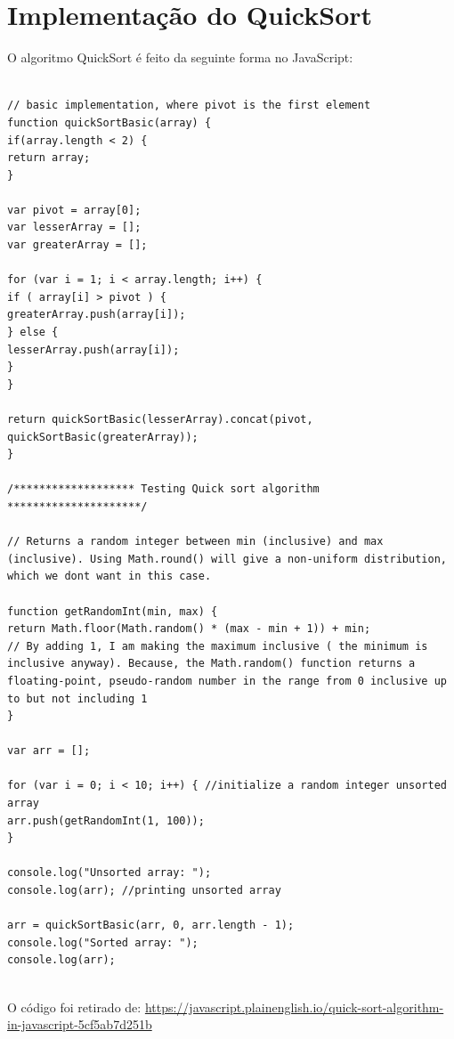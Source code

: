     \section{Implementação do QuickSort}
	O algoritmo QuickSort é feito da seguinte forma no JavaScript:
	\newline
\begin{lstlisting}

// basic implementation, where pivot is the first element
function quickSortBasic(array) {
if(array.length < 2) {
return array;
}

var pivot = array[0];
var lesserArray = [];
var greaterArray = [];

for (var i = 1; i < array.length; i++) {
if ( array[i] > pivot ) {
greaterArray.push(array[i]);
} else {
lesserArray.push(array[i]);
}
}

return quickSortBasic(lesserArray).concat(pivot, quickSortBasic(greaterArray));
}

/******************* Testing Quick sort algorithm *********************/

// Returns a random integer between min (inclusive) and max (inclusive). Using Math.round() will give a non-uniform distribution, which we dont want in this case.

function getRandomInt(min, max) {
return Math.floor(Math.random() * (max - min + 1)) + min;
// By adding 1, I am making the maximum inclusive ( the minimum is inclusive anyway). Because, the Math.random() function returns a floating-point, pseudo-random number in the range from 0 inclusive up to but not including 1
}

var arr = [];

for (var i = 0; i < 10; i++) { //initialize a random integer unsorted array
arr.push(getRandomInt(1, 100));
}

console.log("Unsorted array: ");
console.log(arr); //printing unsorted array

arr = quickSortBasic(arr, 0, arr.length - 1);
console.log("Sorted array: ");
console.log(arr);


\end{lstlisting}
O código foi retirado de:
\url{https://javascript.plainenglish.io/quick-sort-algorithm-in-javascript-5cf5ab7d251b}



